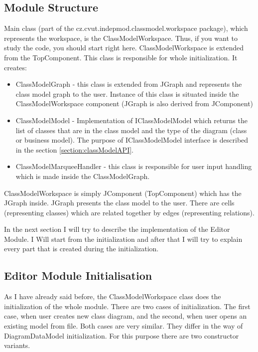\subsection{Module Structure}
\label{section:editorModuleStructure}

Main class (part of the cz.cvut.indepmod.classmodel.workspace package), which represents the workspace, is the ClassModelWorkspace. Thus, if you want to study the code, you should start right here. ClassModelWorkspace is extended from the TopComponent. This class is responsible for whole initialization. It creates:
\begin{itemize}
    \item ClassModelGraph - this class is extended from JGraph and represents the class model graph to the user. Instance of this class is situated inside the ClassModelWorkspace component (JGraph is also derived from JComponent)
    \item ClassModelModel - Implementation of IClassModelModel which returns the list of classes that are in the class model and the type of the diagram (class or business model). The purpose of IClassModelModel interface is described in the section \ref{section:classModelAPI}.
    \item ClassModelMarqueeHandler - this class is responsible for user input handling which is made inside the ClassModelGraph.
\end{itemize}

ClassModelWorkspace is simply JComponent (TopComponent) which has the JGraph inside. JGraph presents the class model to the user. There are cells (representing classes) which are related together by edges (representing relations).

In the next section I will try to describe the implementation of the Editor Module. I Will start from the initialization and after that I will try to explain every part that is created during the initialization.

\subsection{Editor Module Initialisation}

As I have already said before, the ClassModelWorkspace class does the initialization of the whole module. There are two cases of initialization. The first case, when user creates new class diagram, and the second, when user opens an existing model from file. Both cases are very similar. They differ in the way of DiagramDataModel initialization. For this purpose there are two constructor variants.

